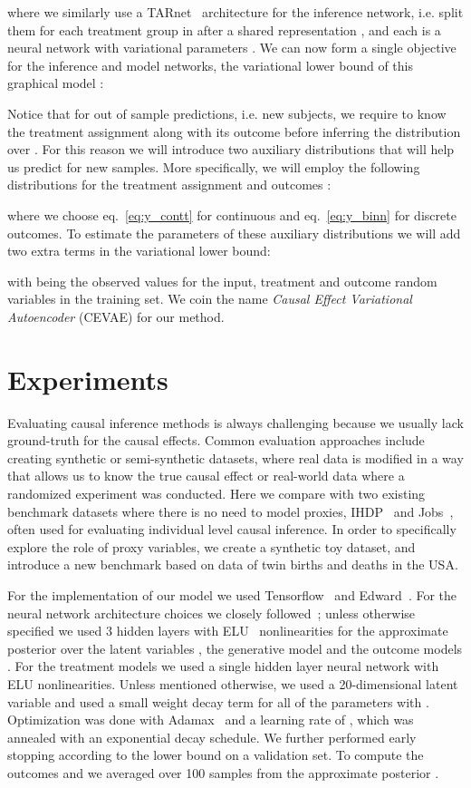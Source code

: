 \documentclass{article}
\begin{document}
where we similarly use a TARnet~\citep{shalit2016estimating} architecture for the inference network, i.e. split them for each treatment group in  after a shared representation , and each  is a neural network with variational parameters . 
We can now form a single objective for the inference and model networks, the variational lower bound of this graphical model \citep{kingma2013auto,rezende2014stochastic}:

Notice that for out of sample predictions, i.e. new subjects, we require to know the treatment assignment  along with its outcome  before inferring the distribution over . For this reason we will introduce two auxiliary distributions that will help us predict  for new samples. More specifically, we will employ the following distributions for the treatment assignment  and outcomes : 

where we choose eq.~\ref{eq:y_contt} for continuous and eq.~\ref{eq:y_binn} for discrete outcomes. To estimate the parameters of these auxiliary distributions we will add two extra terms in the variational lower bound:

with  being the observed values for the input, treatment and outcome random variables in the training set. We coin the name \emph{Causal Effect Variational Autoencoder} (CEVAE) for our method. 
\section{Experiments}
Evaluating causal inference methods is always challenging because we usually lack ground-truth for the causal effects. Common evaluation approaches include creating synthetic or semi-synthetic datasets, where real data is modified in a way that allows us to know the true causal effect or real-world data where a randomized experiment was conducted. Here we compare with two existing benchmark datasets where there is no need to model proxies, IHDP~\citep{hill2011bayesian} and Jobs~\citep{lalonde1986evaluating}, often used for evaluating individual level causal inference. In order to specifically explore the role of proxy variables, we create a synthetic toy dataset, and introduce a new benchmark based on data of twin births and deaths in the USA.

For the implementation of our model we used Tensorflow~\citep{abadi2016tensorflow} and Edward~\citep{tran2016edward}. For the neural network architecture choices we closely followed~\cite{shalit2016estimating}; unless otherwise specified we used 3 hidden layers with ELU~\citep{clevert2015fast} nonlinearities for the approximate posterior over the latent variables , the generative model  and the outcome models . For the treatment models  we used a single hidden layer neural network with ELU nonlinearities. Unless mentioned otherwise, we used a 20-dimensional latent variable  and used a small weight decay term for all of the parameters with . Optimization was done with Adamax~\citep{kingma2014adam} and a learning rate of , which was annealed with an exponential decay schedule. We further performed early stopping according to the lower bound on a validation set. To compute the outcomes  and  we averaged over 100 samples from the approximate posterior .
\end{document}
